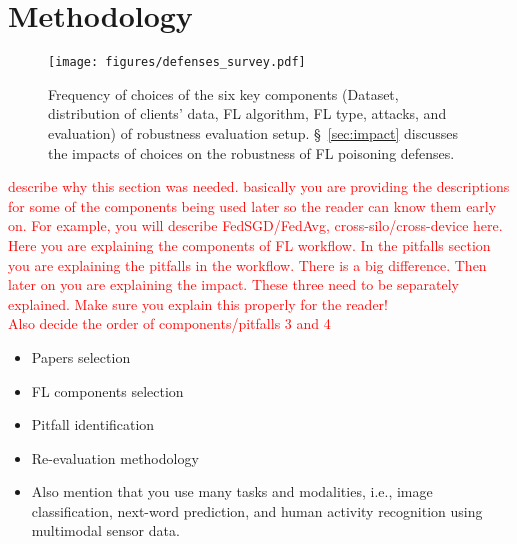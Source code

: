 \section{Methodology}\label{sec:method}

\begin{figure*}
\centering
\texttt{[image: figures/defenses\_survey.pdf]}
\caption{Frequency of choices of the six key components (Dataset, distribution of clients' data, FL algorithm, FL type, attacks, and evaluation) of robustness evaluation setup. \S~\ref{sec:impact} discusses the impacts of choices on the robustness of FL poisoning defenses.}
\label{fig:defense_survey}
\end{figure*}

\textcolor{red}{describe why this section was needed. basically you are providing the descriptions for some of the components being used later so the reader can know them early on. For example, you will describe FedSGD/FedAvg, cross-silo/cross-device here.\\
Here you are explaining the components of FL workflow. In the pitfalls section you are explaining the pitfalls in the workflow. There is a big difference. Then later on you are explaining the impact. These three need to be separately explained. Make sure you explain this properly for the reader!\\
Also decide the order of components/pitfalls 3 and 4}
\begin{itemize}
    \item Papers selection
    \item FL components selection
    \item Pitfall identification
    \item Re-evaluation methodology
    \item Also mention that you use many tasks and modalities, i.e., image classification, next-word prediction, and human activity recognition using multimodal sensor data.
\end{itemize}

